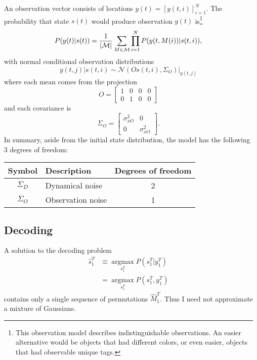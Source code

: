 \documentclass[11pt]{article}
\newcommand{\NormalE}[3]{{\mathcal{N}}\left.\left(#1,#2\right)\right|_{#3}}
\newcommand{\M}{{\cal M}}
\newcommand{\os}[4]{{\left[ #1(#2) \right]}_{#3}^{#4}} %
\newcommand{\ti}[2]{{#1}{(#2)}}                         %
\newcommand{\ts}[4]{{#1}_{#3}^{#4}} %
\newcommand{\argmax}{\operatorname*{argmax}}
\begin{document}
An observation vector consists of locations
$\ti{y}{t}=\os{y}{t,i}{i=1}{N}$.  The probability that state
$\ti{s}{t}$ would produce observation $\ti{y}{t}$ is\footnote{This
  observation model describes indistinguishable observations.  An
  easier alternative would be objects that had different colors, or
  even easier, objects that had observable unique tags.}
\begin{equation}
  \label{eq:ob}
  P(\ti{y}{t}|\ti{s}{t}) =
    \frac{1}{\left|\M \right|} \sum_{M \in \M}
    \prod_{i=1}^{N} P(\ti{y}{t,M(i)}|\ti{s}{t,i}),
\end{equation}
with normal conditional observation distributions
\begin{equation*}
  \ti{y}{t,j}|\ti{s}{t,i} \sim
    \NormalE{O\ti{s}{t,i}}{\Sigma_O}{\ti{y}{t,j}}
\end{equation*}
where each mean comes from the projection
\begin{equation*}
  O = \begin{bmatrix} 1 & 0 & 0 & 0\\
    0 & 1 & 0 & 0 \end{bmatrix}
\end{equation*}
and each covariance is
\begin{equation*}
  \Sigma_O = \begin{bmatrix} \sigma_{xO}^2 & 0 \\ 0 &
    \sigma_{xO}^2 \end{bmatrix}.
\end{equation*}
In summary, aside from the initial state distribution, the model has
the following 3 degrees of freedom:
\begin{center}
  \begin{tabular}{|cp{15em}c|}
    \hline
    Symbol & Description & Degrees of freedom \\
    \hline
    $\Sigma_D$ & Dynamical noise & 2 \\
    $\Sigma_O$ & Observation noise & 1 \\
    \hline
  \end{tabular} 
\end{center}

\subsection{Decoding}
\label{sec:decode1}

A solution to the decoding problem
\begin{align*}
  \ts{\hat s}{\tau}{1}{T} &\equiv \argmax_{\ts{s}{\tau}{1}{T}}
  P(\ts{s}{\tau}{1}{T}|\ts{y}{\tau}{1}{T}) \\
            &=  \argmax_{\ts{s}{\tau}{1}{T}} P(\ts{s}{\tau}{1}{T},\ts{y}{\tau}{1}{T})
\end{align*}
contains only a single sequence of permutations $\ts{\hat
  M}{t}{1}{T}$.  Thus I need not approximate a mixture of Gaussians.
\end{document}
